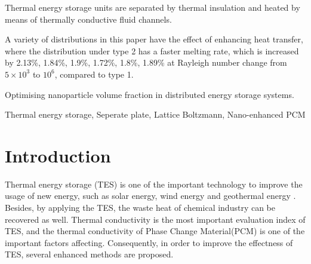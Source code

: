 \documentclass[preprint,12pt]{elsarticle}
\begin{document}
\begin{frontmatter}
	\begin{highlights}
		\item Thermal energy storage units are separated by thermal insulation and heated by means of thermally conductive fluid channels.
		\item A variety of distributions in this paper have the effect of enhancing heat transfer, where the distribution under type 2 has a faster melting rate, which is increased by 2.13\%, 1.84\%, 1.9\%, 1.72\%, 1.8\%, 1.89\% at Rayleigh number change from $ 5\times10^3 $ to $ 10^6 $, compared to type 1.
		\item Optimising nanoparticle volume fraction in distributed energy storage systems.
	\end{highlights}
	
	\begin{keyword}
		Thermal energy storage, Seperate plate, Lattice Boltzmann, Nano-enhanced PCM

	\end{keyword}
	
\end{frontmatter}
\section{Introduction}
Thermal energy storage (TES) is one of the important technology to improve the usage of new energy, such as solar energy, wind energy and geothermal energy \cite{XIAO2023107066}. Besides, by applying the TES, the waste heat of chemical industry can be recovered as well\cite{RN1214}. Thermal conductivity is the most important evaluation index of TES, and the thermal conductivity of Phase Change Material(PCM) is one of the important factors affecting\cite{Prieto2019ThermalES}. Consequently, in order to improve the effectness of TES, several enhanced methods are proposed.
\end{document}
